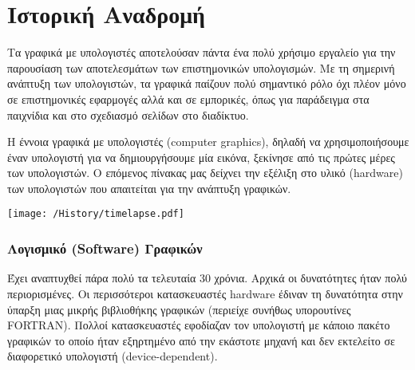 \chapter{Ιστορική Αναδρομή}


Τα γραφικά με υπολογιστές αποτελούσαν πάντα ένα πολύ χρήσιμο εργαλείο
για την παρουσίαση των αποτελεσμάτων των επιστημονικών υπολογισμών. Με τη σημερινή ανάπτυξη των υπολογιστών, τα γραφικά παίζουν πολύ σημαντικό ρόλο όχι πλέον μόνο σε επιστημονικές εφαρμογές αλλά και σε εμπορικές, όπως για παράδειγμα στα παιχνίδια και στο σχεδιασμό σελίδων στο διαδίκτυο.

Η έννοια γραφικά με υπολογιστές (computer graphics), δηλαδή να χρησιμοποιήσουμε έναν υπολογιστή για να δημιουργήσουμε μία εικόνα, ξεκίνησε από τις πρώτες μέρες των υπολογιστών. Ο επόμενος πίνακας μας δείχνει την εξέλιξη στο υλικό (hardware) των υπολογιστών που απαιτείται για την ανάπτυξη γραφικών. 


%
\begin{center}
	\texttt{[image: /History/timelapse.pdf]}
\end{center}

\subsection*{Λογισμικό (Software) Γραφικών}

Έχει αναπτυχθεί πάρα πολύ τα τελευταία 30 χρόνια. Αρχικά οι δυνατότητες ήταν πολύ περιορισμένες. Οι περισσότεροι κατασκευαστές hardware έδιναν τη δυνατότητα στην ύπαρξη μιας μικρής βιβλιοθήκης γραφικών (περιείχε συνήθως υπορουτίνες FORTRAN). Πολλοί κατασκευαστές εφοδίαζαν τον υπολογιστή με κάποιο πακέτο γραφικών το οποίο ήταν εξηρτημένο από την εκάστοτε μηχανή και δεν εκτελείτο σε διαφορετικό υπολογιστή (device-dependent). 

